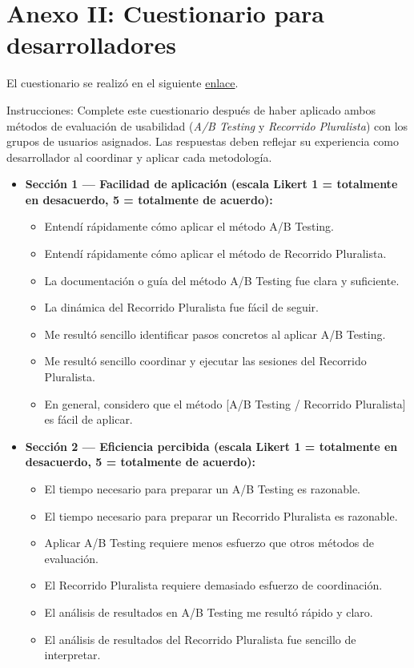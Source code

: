 \documentclass[a4paper,12pt]{report}
\begin{document}
\chapter{Anexo II: Cuestionario para desarrolladores}
\label{anexo:desarrolladores}

El cuestionario se realizó en el siguiente \href{https://docs.google.com/forms/d/1ct0bRRyEHIIYPp2TrhZ53o755vneEbUIfic6f0XR7HM}{enlace}.


Instrucciones: Complete este cuestionario después de haber aplicado ambos métodos de evaluación de usabilidad (\textit{A/B Testing} y \textit{Recorrido Pluralista}) con los grupos de usuarios asignados. Las respuestas deben reflejar su experiencia como desarrollador al coordinar y aplicar cada metodología.

\begin{itemize}
    \item \textbf{Sección 1 — Facilidad de aplicación (escala Likert 1 = totalmente en desacuerdo, 5 = totalmente de acuerdo):}
    \begin{itemize}
        \item Entendí rápidamente cómo aplicar el método A/B Testing.
        \item Entendí rápidamente cómo aplicar el método de Recorrido Pluralista.
        \item La documentación o guía del método A/B Testing fue clara y suficiente.
        \item La dinámica del Recorrido Pluralista fue fácil de seguir.
        \item Me resultó sencillo identificar pasos concretos al aplicar A/B Testing.
        \item Me resultó sencillo coordinar y ejecutar las sesiones del Recorrido Pluralista.
        \item En general, considero que el método [A/B Testing / Recorrido Pluralista] es fácil de aplicar.
    \end{itemize}

    \item \textbf{Sección 2 — Eficiencia percibida (escala Likert 1 = totalmente en desacuerdo, 5 = totalmente de acuerdo):}
    \begin{itemize}
        \item El tiempo necesario para preparar un A/B Testing es razonable.
        \item El tiempo necesario para preparar un Recorrido Pluralista es razonable.
        \item Aplicar A/B Testing requiere menos esfuerzo que otros métodos de evaluación.
        \item El Recorrido Pluralista requiere demasiado esfuerzo de coordinación.
        \item El análisis de resultados en A/B Testing me resultó rápido y claro.
        \item El análisis de resultados del Recorrido Pluralista fue sencillo de interpretar.
    \end{itemize}


\end{itemize}
\end{document}
